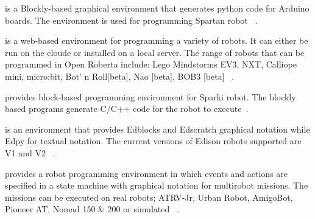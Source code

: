

\parhead{\ardublockly} is a Blockly-based graphical environment that generates python code for Arduino boards. The environment is used for programming Spartan robot ~\cite{Spartan}.%

\parhead{\openroberta} is a web-based environment for programming a variety of robots. It can either be run on the cloude or installed on a local server. The range of robots that can be programmed in Open Roberta include: Lego Mindstorms EV3, NXT, Calliope mini, micro:bit, Bot' n Roll[beta], Nao [beta], BOB3 [beta] ~\cite{OpenRoberta,Jost2015,Ketterl2015}. %

\parhead{\arcbotics} provides block-based programming environment for Sparki robot. The blockly based programs generate C/C++ code for the robot to execute~\cite{ArcboticSparki}. %

\parhead{\edison} is an environment that provides Edblocks and Edscratch graphical notation while Edpy for textual notation. The current versions of Edison robots supported are V1 and V2 ~\cite{Edison}.%

\parhead{\missionlab} provides a robot programming environment in which events and actions are specified in a state machine with graphical notation for multirobot missions. The missions can be executed on real robots; ATRV-Jr, Urban Robot, AmigoBot, Pioneer AT, Nomad 150 \& 200 or simulated ~\cite{arkin2002missionlab,Ulam2007}.%


